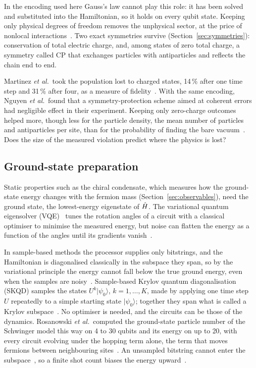 In the encoding used here Gauss's law cannot play this role: it has been solved
and substituted into the Hamiltonian, so it holds on every qubit state. Keeping
only physical degrees of freedom removes the unphysical sector, at the price of
nonlocal interactions~\cite{stryker2019}. Two exact symmetries survive
(Section~\ref{sec:symmetries}): conservation of total electric charge, and,
among states of zero total charge, a symmetry called CP that exchanges particles
with antiparticles and reflects the chain end to end.

Martinez \emph{et al.}\ took the population lost to charged states, 14\,\%
after one time step and 31\,\% after four, as a measure of
fidelity~\cite{martinez2016}. With the same encoding, Nguyen \emph{et al.}\
found that a symmetry-protection scheme aimed at coherent errors had negligible
effect in their experiment. Keeping only zero-charge outcomes helped more,
though less for the particle density, the mean number of particles and
antiparticles per site, than for the probability of finding the bare
vacuum~\cite{nguyen2022}. Does the size of the measured violation predict
where the physics is lost?

\subsection{Ground-state preparation}

Static properties such as the chiral condensate, which measures how the
ground-state energy changes with the fermion mass (Section~\ref{sec:observables}),
need the ground state, the lowest-energy eigenstate of $\hat{H}$. The variational
quantum eigensolver (VQE)~\cite{peruzzo2014,kandala2017} tunes the rotation
angles of a circuit with a classical optimiser to minimise the measured energy,
but noise can flatten the energy as a function of the angles until its gradients
vanish~\cite{wang2021}.

In sample-based methods the processor supplies only bitstrings, and the
Hamiltonian is diagonalised classically in the subspace they span, so by the
variational principle the energy cannot fall below the true ground energy, even
when the samples are noisy~\cite{kanno2023,robledo2025}. Sample-based Krylov
quantum diagonalisation (SKQD) samples the states $U^k|\psi_0\rangle$,
$k = 1,\dots,K$, made by applying one time step $U$ repeatedly to a simple
starting state $|\psi_0\rangle$; together they span what is called a Krylov
subspace~\cite{yu2025}. No optimiser is needed, and the circuits can be those of
the dynamics. Rosanowski \emph{et al.}\ computed the ground-state particle
number of the Schwinger model this way on 4 to 30 qubits and its energy on up to
20, with every circuit evolving under the hopping term alone, the term that
moves fermions between neighbouring sites~\cite{rosanowski2025}. An unsampled
bitstring cannot enter the subspace~\cite{miura2026}, so a finite shot count
biases the energy upward~\cite{kanno2023}.

